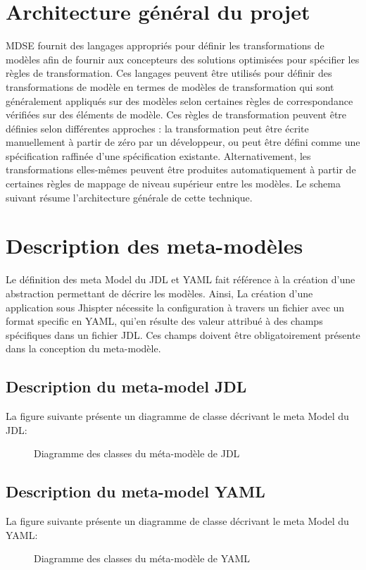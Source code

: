 \section{Architecture général du projet}

MDSE fournit des langages appropriés pour définir les transformations de
modèles afin de fournir aux concepteurs des solutions optimisées pour
spécifier les règles de transformation. Ces langages peuvent être
utilisés pour définir des transformations de modèle en termes de modèles
de transformation qui sont généralement appliqués sur des modèles selon
certaines règles de correspondance vérifiées sur des éléments de modèle.
Ces règles de transformation peuvent être définies selon différentes
approches : la transformation peut être écrite manuellement à partir de
zéro par un développeur, ou peut être défini comme une spécification
raffinée d'une spécification existante. Alternativement, les
transformations elles-mêmes peuvent être produites automatiquement à
partir de certaines règles de mappage de niveau supérieur entre les
modèles. Le schema suivant résume l'architecture générale de cette
technique.

\section{Description des meta-modèles}

Le définition des meta Model du JDL et YAML fait référence à la création
d'une abstraction permettant de décrire les modèles. Ainsi, La création
d'une application sous Jhispter nécessite la configuration à 
travers un fichier avec un format specific en YAML, qui'en résulte
des valeur attribué à des champs spécifiques dans un fichier JDL. 
Ces champs doivent être obligatoirement présente dans la conception
du meta-modèle.

\subsection{Description du meta-model JDL}

La figure suivante présente un diagramme de classe décrivant 
le meta Model du JDL:

\begin{figure}[H]
  \begin{center}
      \caption{Diagramme des classes du méta-modèle de JDL}
  \end{center}
\end{figure}

\subsection{Description du meta-model YAML}

La figure suivante présente un diagramme de classe décrivant 
le meta Model du YAML:

\begin{figure}[H]
  \begin{center}
      \caption{Diagramme des classes du méta-modèle de YAML}
  \end{center}
\end{figure}
